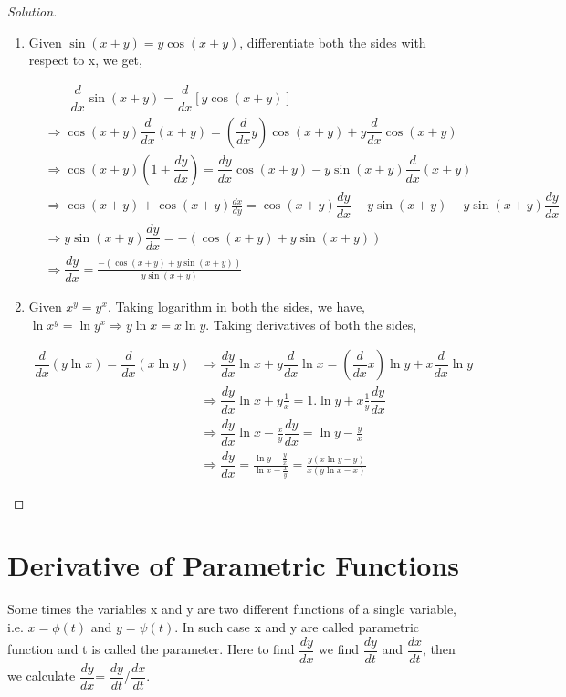 \documentclass[../../main.tex]{subfiles}
\theoremstyle{definition}
\newenvironment{solution}
    {\begin{proof}[Solution]}
    {\end{proof}}
\begin{document}
\begin{solution}
\begin{enumerate}[label=(\roman*)]
\item Given $\sin (x+y)=y \cos (x+y)$, differentiate both the sides with respect to x, we get,

\begin{align*}
&\qquad \dfrac{d}{dx}{\sin (x+y)}=\dfrac{d}{dx}\left[y\cos (x+y)\right] \\
&\Rightarrow \cos (x+y)\dfrac{d}{dx}(x+y)=(\dfrac{d}{dx}y)\cos (x+y)+y \dfrac{d}{dx}\cos(x+y) \\ 
&\Rightarrow \cos (x+y)(1+\dfrac{dy}{dx}) = \dfrac{dy}{dx}\cos (x+y)-y\sin (x+y)\dfrac{d}{dx}(x+y) \\ 
&\Rightarrow \cos (x+y)+\cos (x+y)\frac{dx}{dy}=\cos (x+y)\dfrac{dy}{dx}-y\sin (x+y)-y\sin (x+y)\dfrac{dy}{dx} \\
&\Rightarrow y\sin(x+y)\dfrac{dy}{dx}=-(\cos (x+y)+y\sin (x+y)) \\
&\Rightarrow \dfrac{dy}{dx}=\frac{-(\cos (x+y)+y\sin (x+y))}{y\sin (x+y)}
\end{align*}

\item Given $x^y=y^x$. Taking logarithm in both the sides, we have,
$\ln x^y=\ln y^x \Rightarrow y \ln x=x\ln y$. Taking derivatives of both the sides, 

\begin{align*}
    \dfrac{d}{dx}(y \ln x)=\dfrac{d}{dx}(x \ln y) &\Rightarrow \dfrac{dy}{dx}\ln x+y\dfrac{d}{dx}\ln x=(\dfrac{d}{dx}x)\ln y+x\dfrac{d}{dx}\ln y \\
    &\Rightarrow \dfrac{dy}{dx}\ln x+y\frac{1}{x}=1.\ln y+x\frac{1}{y}\dfrac{dy}{dx} \\ 
    &\Rightarrow\dfrac{dy}{dx}\ln x-\frac{x}{y}\dfrac{dy}{dx}= \ln y-\frac{y}{x} \\
    &\Rightarrow \dfrac{dy}{dx}=\frac{\ln y-\frac{y}{x}}{\ln x-\frac{x}{y}} = \frac{y(x\ln y-y)}{x(y\ln x-x)}
\end{align*}

\end{enumerate}
\end{solution}


\section{Derivative of Parametric Functions}

Some times the variables x and y are two different functions of a single variable, i.e. $x=\phi(t)$ and $y=\psi(t)$. In such case x and y are called parametric function and t is called the parameter. Here to find $\dfrac{dy}{dx}$ we find $\dfrac{dy}{dt}$ and $\dfrac{dx}{dt}$, then we calculate $\dfrac{dy}{dx}$= $\dfrac{dy}{dt}$/$\dfrac{dx}{dt}$.
\end{document}
